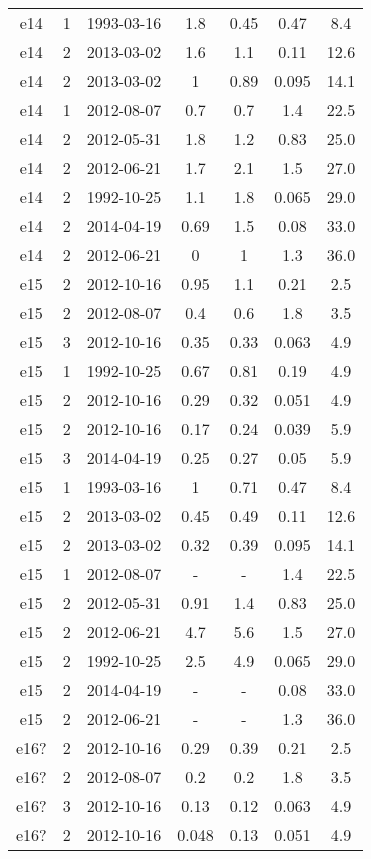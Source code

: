 \begin{table*}[htp]
\begin{tabular}{ccccccc}
e14 & 1 & 1993-03-16 & 1.8 & 0.45 & 0.47 & 8.4 \\
e14 & 2 & 2013-03-02 & 1.6 & 1.1 & 0.11 & 12.6 \\
e14 & 2 & 2013-03-02 & 1 & 0.89 & 0.095 & 14.1 \\
e14 & 1 & 2012-08-07 & 0.7 & 0.7 & 1.4 & 22.5 \\
e14 & 2 & 2012-05-31 & 1.8 & 1.2 & 0.83 & 25.0 \\
e14 & 2 & 2012-06-21 & 1.7 & 2.1 & 1.5 & 27.0 \\
e14 & 2 & 1992-10-25 & 1.1 & 1.8 & 0.065 & 29.0 \\
e14 & 2 & 2014-04-19 & 0.69 & 1.5 & 0.08 & 33.0 \\
e14 & 2 & 2012-06-21 & 0 & 1 & 1.3 & 36.0 \\
e15 & 2 & 2012-10-16 & 0.95 & 1.1 & 0.21 & 2.5 \\
e15 & 2 & 2012-08-07 & 0.4 & 0.6 & 1.8 & 3.5 \\
e15 & 3 & 2012-10-16 & 0.35 & 0.33 & 0.063 & 4.9 \\
e15 & 1 & 1992-10-25 & 0.67 & 0.81 & 0.19 & 4.9 \\
e15 & 2 & 2012-10-16 & 0.29 & 0.32 & 0.051 & 4.9 \\
e15 & 2 & 2012-10-16 & 0.17 & 0.24 & 0.039 & 5.9 \\
e15 & 3 & 2014-04-19 & 0.25 & 0.27 & 0.05 & 5.9 \\
e15 & 1 & 1993-03-16 & 1 & 0.71 & 0.47 & 8.4 \\
e15 & 2 & 2013-03-02 & 0.45 & 0.49 & 0.11 & 12.6 \\
e15 & 2 & 2013-03-02 & 0.32 & 0.39 & 0.095 & 14.1 \\
e15 & 1 & 2012-08-07 & - & - & 1.4 & 22.5 \\
e15 & 2 & 2012-05-31 & 0.91 & 1.4 & 0.83 & 25.0 \\
e15 & 2 & 2012-06-21 & 4.7 & 5.6 & 1.5 & 27.0 \\
e15 & 2 & 1992-10-25 & 2.5 & 4.9 & 0.065 & 29.0 \\
e15 & 2 & 2014-04-19 & - & - & 0.08 & 33.0 \\
e15 & 2 & 2012-06-21 & - & - & 1.3 & 36.0 \\
e16? & 2 & 2012-10-16 & 0.29 & 0.39 & 0.21 & 2.5 \\
e16? & 2 & 2012-08-07 & 0.2 & 0.2 & 1.8 & 3.5 \\
e16? & 3 & 2012-10-16 & 0.13 & 0.12 & 0.063 & 4.9 \\
e16? & 2 & 2012-10-16 & 0.048 & 0.13 & 0.051 & 4.9 \\

\end{tabular}
\end{table*}
